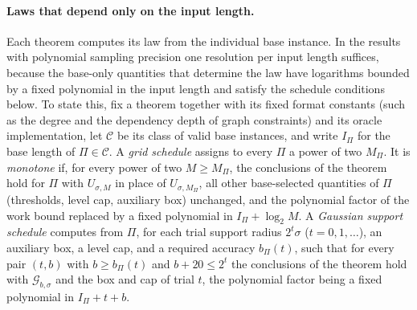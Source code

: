 \paragraph{Laws that depend only on the input length.}
Each theorem computes its law from the individual base instance. In the
results with polynomial sampling precision one resolution per input length
suffices, because the base-only quantities that determine the law have
logarithms bounded by a fixed polynomial in the input length and satisfy the
schedule conditions below. To state this, fix a theorem together with its
fixed format constants (such as the degree and the dependency depth of graph
constraints) and its oracle implementation, let $\mathcal C$ be its class of
valid base instances, and write $I_\Pi$ for the base length of
$\Pi\in\mathcal C$. A \emph{grid schedule} assigns to every $\Pi$ a power of
two $M_\Pi$. It is \emph{monotone} if, for every power of two $M\ge M_\Pi$,
the conclusions of the theorem hold for $\Pi$ with $U_{\sigma,M}$ in place of
$U_{\sigma,M_\Pi}$, all other base-selected quantities of $\Pi$ (thresholds,
level cap, auxiliary box) unchanged, and the polynomial factor of the work
bound replaced by a fixed polynomial in $I_\Pi+\log_2M$. A \emph{Gaussian
support schedule} computes from $\Pi$, for each trial support radius
$2^t\sigma$ ($t=0,1,\dots$), an auxiliary box, a level cap, and a required
accuracy $b_\Pi(t)$, such that for every pair $(t,b)$ with $b\ge b_\Pi(t)$ and
$b+20\le2^t$ the conclusions of the theorem hold with $\mathcal G_{b,\sigma}$
and the box and cap of trial $t$, the polynomial factor being a fixed
polynomial in $I_\Pi+t+b$.

